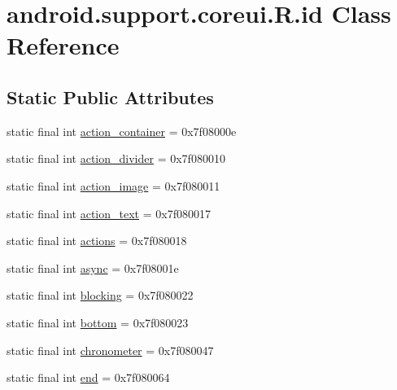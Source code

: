 \hypertarget{classandroid_1_1support_1_1coreui_1_1_r_1_1id}{}\section{android.\+support.\+coreui.\+R.\+id Class Reference}
\label{classandroid_1_1support_1_1coreui_1_1_r_1_1id}
\subsection*{Static Public Attributes}
\begin{DoxyCompactItemize}
\item 
static final int \mbox{\hyperlink{classandroid_1_1support_1_1coreui_1_1_r_1_1id_ab08f73dec2ffe5900d7e26308a41ca1a}{action\+\_\+container}} = 0x7f08000e
\item 
static final int \mbox{\hyperlink{classandroid_1_1support_1_1coreui_1_1_r_1_1id_aadbd486f98091a3758271424dee39faf}{action\+\_\+divider}} = 0x7f080010
\item 
static final int \mbox{\hyperlink{classandroid_1_1support_1_1coreui_1_1_r_1_1id_ab9210a0246b32bd9b958a161e42647f4}{action\+\_\+image}} = 0x7f080011
\item 
static final int \mbox{\hyperlink{classandroid_1_1support_1_1coreui_1_1_r_1_1id_a04ddcfd3534baf08dd481c9f6b309156}{action\+\_\+text}} = 0x7f080017
\item 
static final int \mbox{\hyperlink{classandroid_1_1support_1_1coreui_1_1_r_1_1id_a2f8a984090fad6cdcf746163f68590ce}{actions}} = 0x7f080018
\item 
static final int \mbox{\hyperlink{classandroid_1_1support_1_1coreui_1_1_r_1_1id_a6d2b515de1846dbedb9dbf58bbbb618f}{async}} = 0x7f08001e
\item 
static final int \mbox{\hyperlink{classandroid_1_1support_1_1coreui_1_1_r_1_1id_a448f92c365418e0e65bde41ec6ba7727}{blocking}} = 0x7f080022
\item 
static final int \mbox{\hyperlink{classandroid_1_1support_1_1coreui_1_1_r_1_1id_a8e839cd3fee198c2aa49ece29b128216}{bottom}} = 0x7f080023
\item 
static final int \mbox{\hyperlink{classandroid_1_1support_1_1coreui_1_1_r_1_1id_a5fe7d48ab6417172fb6efe0bb56d660c}{chronometer}} = 0x7f080047
\item 
static final int \mbox{\hyperlink{classandroid_1_1support_1_1coreui_1_1_r_1_1id_a4d58a5ca166d5967a729f592bd0ad225}{end}} = 0x7f080064
\item 

\end{DoxyCompactItemize}

